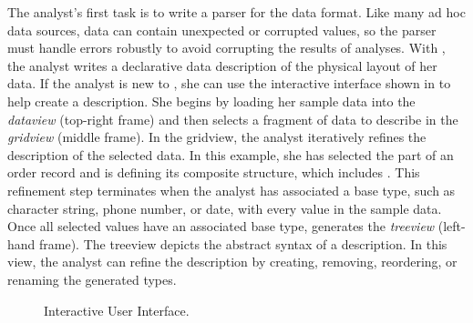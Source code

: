 The analyst's first task is to write a parser for the \dibbler{} data
format.  Like many ad hoc data sources, \dibbler{} data can contain
unexpected or corrupted values, so the parser must handle errors
robustly to avoid corrupting the results of analyses.  With \pads{},
the analyst writes a declarative data description of the physical
layout of her data.  
If the analyst is new to \pads{}, she can use the \launchpads{} interactive 
interface shown in  to help create a \pads{}
description.  She begins by loading her sample data into
the {\it dataview} (top-right frame) and then selects a fragment of
data to describe in the {\it gridview} (middle frame).  In the
gridview, the analyst iteratively refines the description of the
selected data.  In this example, she has selected the 
part of an order record and is defining its composite structure, which
includes .  This refinement step terminates when the
analyst has associated a base type, such as character string, phone
number, or date, with every value in the sample data.  Once all
selected values have an associated base type, \textsc{\launchpads{}}
generates the {\it treeview} (left-hand frame).  The treeview depicts
the abstract syntax of a \pads{} description.  In this view, the
analyst can refine the description by creating, removing,
reordering, or renaming the generated types.
\begin{figure}
  \begin{center}
  \end{center}
  \caption{\launchpads{} Interactive User Interface.}
  \label{figure:launchpads}
\end{figure}

